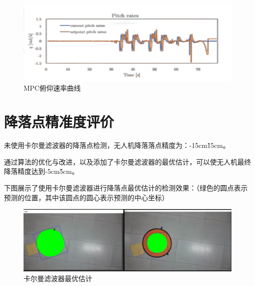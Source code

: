 \begin{figure}[ht]
  \centering
  \includegraphics[width=0.8\linewidth]{./Figure/MPC-Pitch-Rates.png}
  \caption{MPC俯仰速率曲线}\label{Fig:xd1}
\end{figure}

\section{降落点精准度评价}

未使用卡尔曼滤波器的降落点检测，无人机降落落点精度为：-15cm\~15cm。

通过算法的优化与改进，以及添加了卡尔曼滤波器的最优估计，可以使无人机最终降落精度达到-5cm\~5cm。

下图展示了使用卡尔曼滤波器进行降落点最优估计的检测效果：（绿色的圆点表示预测的位置，其中该圆点的圆心表示预测的中心坐标）

\begin{figure}[ht]
  \centering
  \includegraphics[width=0.8\linewidth]{./Figure/Kalman_Prediction.png}
  \caption{卡尔曼滤波器最优估计}\label{Fig:xd1}
\end{figure}

